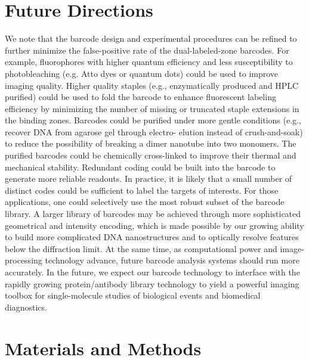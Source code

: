 \section{Future Directions}
We note that the barcode design and experimental procedures can be refined to 
further minimize the false-positive rate of the dual-labeled-zone barcodes. For example, 
fluorophores with higher quantum efficiency and less susceptibility to photobleaching 
(e.g. Atto dyes or quantum dots) could be used to improve imaging quality. Higher 
quality staples (e.g., enzymatically produced and HPLC purified) could be used to fold 
the barcode to enhance fluorescent labeling efficiency by minimizing the number of 
missing or truncated staple extensions in the binding zones. Barcodes could be purified 
under more gentle conditions (e.g., recover DNA from agarose gel through electro- 
elution \citep{bellot_recovery_2011} instead of crush-and-soak) to reduce the possibility of breaking a dimer 
nanotube into two monomers. The purified barcodes could be chemically cross-linked \citep{rajendran_photo-cross-linking-assisted_2011}
to improve their thermal and mechanical stability. Redundant coding could be built into 
the barcode to generate more reliable readouts. In practice, it is likely that a small number 
of distinct codes could be sufficient to label the targets of interests. For those 
applications, one could selectively use the most robust subset of the barcode library. A 
larger library of barcodes may be achieved through more sophisticated geometrical and 
intensity encoding, which is made possible by our growing ability to build more 
complicated DNA nanostructures and to optically resolve features below the diffraction 
limit. At the same time, as computational power and image-processing technology 
advance, future barcode analysis systems should run more accurately. In the future, we 
expect our barcode technology to interface with the rapidly growing protein/antibody 
library technology to yield a powerful imaging toolbox for single-molecule studies of 
biological events and biomedical diagnostics. 


\section{Materials and Methods}
